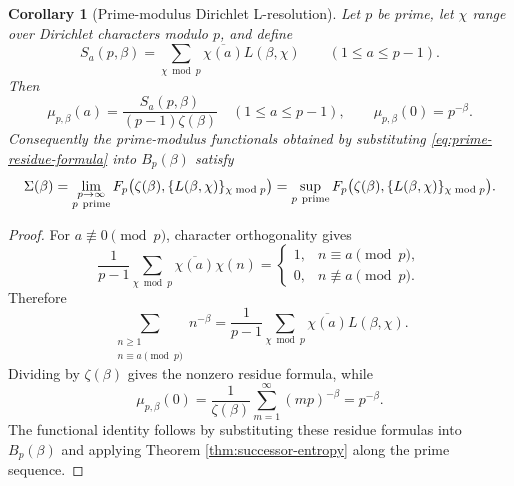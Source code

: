 \documentclass[11pt]{article}
\numberwithin{equation}{section}
\newtheorem{corollary}[theorem]{Corollary}
\theoremstyle{definition}
\theoremstyle{remark}
\newcommand{\1}{\mathbf 1}
\begin{document}
\begin{corollary}[Prime-modulus Dirichlet L-resolution]
\label{cor:prime-dirichlet-resolution}
Let \(p\) be prime, let \(\chi\) range over Dirichlet characters modulo \(p\), and define
\begin{equation}
\label{eq:prime-dirichlet-shadow}
S_a(p,\beta)=\sum_{\chi\bmod p}\overline{\chi(a)}L(\beta,\chi)
\qquad(1\le a\le p-1).
\end{equation}
Then
\begin{equation}
\label{eq:prime-residue-formula}
\mu_{p,\beta}(a)=\frac{S_a(p,\beta)}{(p-1)\zeta(\beta)}
\quad(1\le a\le p-1),
\qquad
\mu_{p,\beta}(0)=p^{-\beta}.
\end{equation}
Consequently the prime-modulus functionals obtained by substituting \eqref{eq:prime-residue-formula} into \(B_p(\beta)\) satisfy
\begin{equation}
\label{eq:prime-functional-limit}
\Sigma(\beta)=
\lim_{\substack{p\to\infty\\ p\ {\rm prime}}}
F_p\bigl(\zeta(\beta),\{L(\beta,\chi)\}_{\chi\bmod p}\bigr)
=
\sup_{p\ {\rm prime}}
F_p\bigl(\zeta(\beta),\{L(\beta,\chi)\}_{\chi\bmod p}\bigr).
\end{equation}
\end{corollary}

\begin{proof}
For \(a\not\equiv0\pmod p\), character orthogonality gives
\begin{equation}
\label{eq:character-orthogonality}
\frac1{p-1}\sum_{\chi\bmod p}\overline{\chi(a)}\chi(n)
=
\begin{cases}
1,& n\equiv a\pmod p,\\
0,& n\not\equiv a\pmod p.
\end{cases}
\end{equation}
Therefore
\begin{equation}
\label{eq:dirichlet-residue-sum}
\sum_{\substack{n\ge1\\ n\equiv a\pmod p}}n^{-\beta}
=\frac1{p-1}\sum_{\chi\bmod p}\overline{\chi(a)}L(\beta,\chi).
\end{equation}
Dividing by \(\zeta(\beta)\) gives the nonzero residue formula, while
\begin{equation}
\label{eq:zero-residue-prime}
\mu_{p,\beta}(0)=\frac1{\zeta(\beta)}\sum_{m=1}^{\infty}(mp)^{-\beta}
=p^{-\beta}.
\end{equation}
The functional identity follows by substituting these residue formulas into \(B_p(\beta)\) and applying Theorem \ref{thm:successor-entropy} along the prime sequence.
\end{proof}
\end{document}
